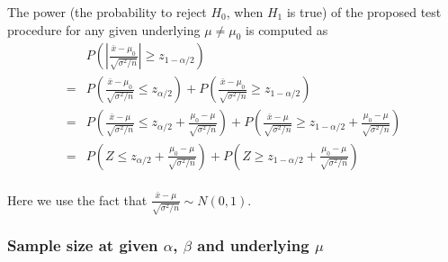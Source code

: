 \documentclass[a4paper,12pt]{article}
\begin{document}
The power (the probability to reject $H_0$, when $H_1$ is true) of the proposed test procedure for any given underlying $\mu \neq \mu_0$ is computed as
\begin{equation}
  \label{eq:power_equation_one_sample_sigma_known}
  \begin{aligned}
    & P\left(
      \left|
      \frac{\bar{x} - \mu_0}{\sqrt{\sigma^2 / n}}
      \right|
      \geq z_{1 - \alpha / 2}
      \right)    \\
    = & P\left(
        \frac{\bar{x} - \mu_0}{\sqrt{\sigma^2 / n}}
        \leq z_{\alpha / 2}
        \right)
        + P\left(
        \frac{\bar{x} - \mu_0}{\sqrt{\sigma^2 / n}}
        \geq z_{1 - \alpha / 2}
        \right)    \\
    = & P\left(
        \frac{\bar{x} - \mu}{\sqrt{\sigma^2 / n}}
        \leq z_{\alpha / 2}
        + \frac{\mu_0 - \mu}{\sqrt{\sigma^2 / n}}
        \right)
        + P\left(
        \frac{\bar{x} - \mu}{\sqrt{\sigma^2 / n}}
        \geq z_{1 - \alpha / 2}
        + \frac{\mu_0 - \mu}{\sqrt{\sigma^2 / n}}
        \right)    \\
    = & P\left(
        Z
        \leq z_{\alpha / 2}
        + \frac{\mu_0 - \mu}{\sqrt{\sigma^2 / n}}
        \right)
        + P\left(
        Z
        \geq z_{1 - \alpha / 2}
        + \frac{\mu_0 - \mu}{\sqrt{\sigma^2 / n}}
        \right)    \\
  \end{aligned}  
\end{equation}

Here we use the fact that $  \frac{\bar{x} - \mu}{\sqrt{\sigma^2 / n}} \sim N\left(0, 1\right)$. 

\subsubsection{Sample size at given $\alpha$, $\beta$ and underlying $\mu$}
\label{sec:sample-size-at}
\end{document}
